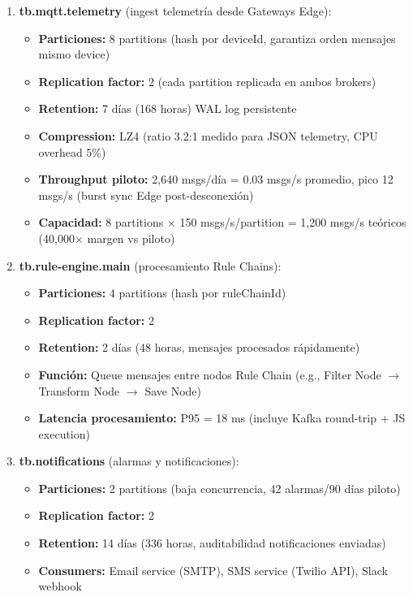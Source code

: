 \begin{enumerate}
    \item \textbf{tb.mqtt.telemetry} (ingest telemetría desde Gateways Edge):
    \begin{itemize}
        \item \textbf{Particiones:} 8 partitions (hash por deviceId, garantiza orden mensajes mismo device)
        \item \textbf{Replication factor:} 2 (cada partition replicada en ambos brokers)
        \item \textbf{Retention:} 7 días (168 horas) WAL log persistente
        \item \textbf{Compression:} LZ4 (ratio 3.2:1 medido para JSON telemetry, CPU overhead 5\%)
        \item \textbf{Throughput piloto:} 2,640 msgs/día = 0.03 msgs/s promedio, pico 12 msgs/s (burst sync Edge post-desconexión)
        \item \textbf{Capacidad:} 8 partitions $\times$ 150 msgs/s/partition = 1,200 msgs/s teóricos (40,000$\times$ margen vs piloto)
    \end{itemize}
    
    \item \textbf{tb.rule-engine.main} (procesamiento Rule Chains):
    \begin{itemize}
        \item \textbf{Particiones:} 4 partitions (hash por ruleChainId)
        \item \textbf{Replication factor:} 2
        \item \textbf{Retention:} 2 días (48 horas, mensajes procesados rápidamente)
        \item \textbf{Función:} Queue mensajes entre nodos Rule Chain (e.g., Filter Node $\rightarrow$ Transform Node $\rightarrow$ Save Node)
        \item \textbf{Latencia procesamiento:} P95 = 18 ms (incluye Kafka round-trip + JS execution)
    \end{itemize}
    
    \item \textbf{tb.notifications} (alarmas y notificaciones):
    \begin{itemize}
        \item \textbf{Particiones:} 2 partitions (baja concurrencia, 42 alarmas/90 días piloto)
        \item \textbf{Replication factor:} 2
        \item \textbf{Retention:} 14 días (336 horas, auditabilidad notificaciones enviadas)
        \item \textbf{Consumers:} Email service (SMTP), SMS service (Twilio API), Slack webhook
    \end{itemize}
    

\end{enumerate}
